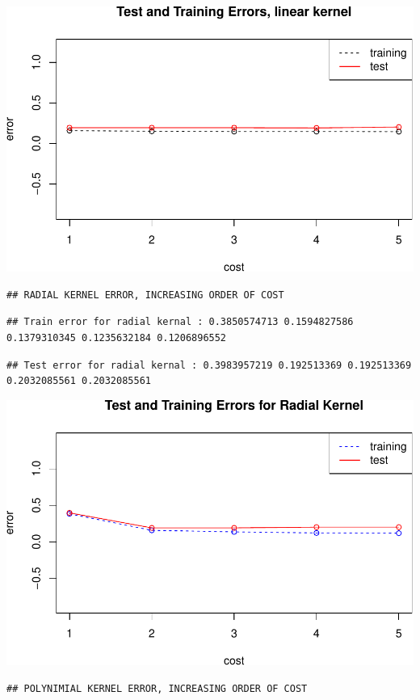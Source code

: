 \documentclass[]{article}
\begin{document}
\includegraphics{HW5_Solution_files/figure-latex/unnamed-chunk-4-1.pdf}

\begin{verbatim}
## RADIAL KERNEL ERROR, INCREASING ORDER OF COST
\end{verbatim}

\begin{verbatim}
## Train error for radial kernal : 0.3850574713 0.1594827586 0.1379310345 0.1235632184 0.1206896552
\end{verbatim}

\begin{verbatim}
## Test error for radial kernal : 0.3983957219 0.192513369 0.192513369 0.2032085561 0.2032085561
\end{verbatim}

\includegraphics{HW5_Solution_files/figure-latex/unnamed-chunk-4-2.pdf}

\begin{verbatim}
## POLYNIMIAL KERNEL ERROR, INCREASING ORDER OF COST
\end{verbatim}
\end{document}
